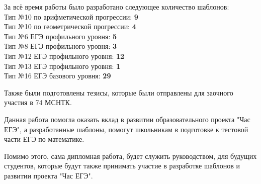 За всё время работы было разработано следующее количество шаблонов:
\\Тип №10 по арифметической прогрессии: \textbf{9}
\\Тип №10 по геометрической прогрессии: \textbf{4}
\\Тип №6 ЕГЭ профильного уровня: \textbf{5}
\\Тип №8 ЕГЭ профильного уровня: \textbf{3}
\\Тип №12 ЕГЭ профильного уровня: \textbf{12}
\\Тип №13 ЕГЭ профильного уровня: \textbf{1}
\\Тип №16 ЕГЭ базового уровня: \textbf{29}

Также были подготовлены тезисы, которые были отправлены для заочного участия в 74 МСНТК.

Данная работа помогла оказать вклад в развитии образовательного проекта "Час ЕГЭ", а разработанные шаблоны, помогут школьникам в подготовке к тестовой части ЕГЭ по математике. 

Помимо этого, сама дипломная работа, будет служить руководством, для будущих студентов, которые будут также принимать участие в разработке шаблонов и развитии проекта "Час ЕГЭ".


